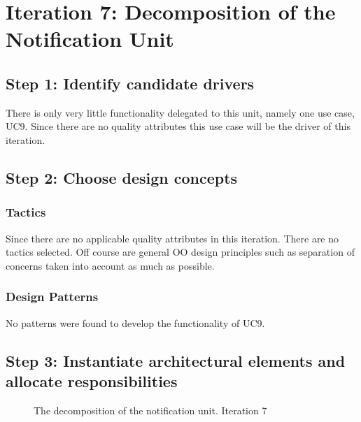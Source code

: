 \section{Iteration 7: Decomposition of the Notification Unit}
\label{add:it7}

\subsection{Step 1: Identify candidate drivers}
\label{add:it7/drivers}

\npar There is only very little functionality delegated to this unit, namely one
use case, UC9. Since there are no quality attributes this use case will be the
driver of this iteration.

\subsection{Step 2: Choose design concepts}
\label{add:it7/concepts}

\subsubsection{Tactics}
\label{add:it7/tactics}

\npar Since there are no applicable quality attributes in this iteration. There
are no tactics selected. Off course are general OO design principles such as
separation of concerns taken into account as much as possible.

\subsubsection{Design Patterns}
\label{add:it7/patterns}

\npar No patterns were found to develop the functionality of UC9.

\subsection{Step 3: Instantiate architectural elements and allocate responsibilities}
\label{add:it7/elements}

\begin{figure}[H]
	\begin{centering}
		\caption{The decomposition of the notification unit. Iteration 7}
		\label{fig:add/it7/decomposition}
	\end{centering}
\end{figure}

